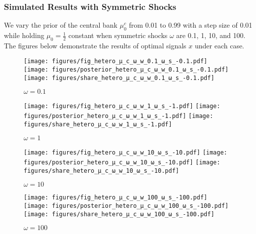 \documentclass[12pt,a4paper]{article}
\begin{document}
\subsubsection{Simulated Results with Symmetric Shocks}
We vary the prior of the central bank $\mu_0^c$ from 0.01 to 0.99 with a step size of 0.01 while holding $\mu_0=\frac{1}{2}$ constant when symmetric shocks $\omega$ are 0.1, 1, 10, and 100. The figures below demonstrate the results of optimal signals $x$ under each case.
\begin{figure}[htp!]
\caption{$\omega=0.1$}
\centering
\texttt{[image: figures/fig\_hetero\_μ\_c\_ω\_w\_0.1\_ω\_s\_-0.1.pdf]}
\texttt{[image: figures/posterior\_hetero\_μ\_c\_ω\_w\_0.1\_ω\_s\_-0.1.pdf]}
\texttt{[image: figures/share\_hetero\_μ\_c\_ω\_w\_0.1\_ω\_s\_-0.1.pdf]}
\end{figure}
\begin{figure}[htp!]
\caption{$\omega=1$}
\centering
\texttt{[image: figures/fig\_hetero\_μ\_c\_ω\_w\_1\_ω\_s\_-1.pdf]}
\texttt{[image: figures/posterior\_hetero\_μ\_c\_ω\_w\_1\_ω\_s\_-1.pdf]}
\texttt{[image: figures/share\_hetero\_μ\_c\_ω\_w\_1\_ω\_s\_-1.pdf]}
\end{figure}
\begin{figure}[htp!]
\caption{$\omega=10$}
\centering
\texttt{[image: figures/fig\_hetero\_μ\_c\_ω\_w\_10\_ω\_s\_-10.pdf]}
\texttt{[image: figures/posterior\_hetero\_μ\_c\_ω\_w\_10\_ω\_s\_-10.pdf]}
\texttt{[image: figures/share\_hetero\_μ\_c\_ω\_w\_10\_ω\_s\_-10.pdf]}
\end{figure}
\begin{figure}[htp!]
\caption{$\omega=100$}
\centering
\texttt{[image: figures/fig\_hetero\_μ\_c\_ω\_w\_100\_ω\_s\_-100.pdf]}
\texttt{[image: figures/posterior\_hetero\_μ\_c\_ω\_w\_100\_ω\_s\_-100.pdf]}
\texttt{[image: figures/share\_hetero\_μ\_c\_ω\_w\_100\_ω\_s\_-100.pdf]}
\end{figure}
\end{document}

